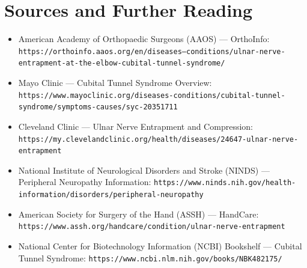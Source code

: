 \section*{Sources and Further Reading}
\begin{itemize}
\item American Academy of Orthopaedic Surgeons (AAOS) --- OrthoInfo: \texttt{https://orthoinfo.aaos.org/en/diseases--conditions/ulnar-nerve-entrapment-at-the-elbow-cubital-tunnel-syndrome/}
\item Mayo Clinic --- Cubital Tunnel Syndrome Overview: \texttt{https://www.mayoclinic.org/diseases-conditions/cubital-tunnel-syndrome/symptoms-causes/syc-20351711}
\item Cleveland Clinic --- Ulnar Nerve Entrapment and Compression: \texttt{https://my.clevelandclinic.org/health/diseases/24647-ulnar-nerve-entrapment}
\item National Institute of Neurological Disorders and Stroke (NINDS) --- Peripheral Neuropathy Information: \texttt{https://www.ninds.nih.gov/health-information/disorders/peripheral-neuropathy}
\item American Society for Surgery of the Hand (ASSH) --- HandCare: \texttt{https://www.assh.org/handcare/condition/ulnar-nerve-entrapment}
\item National Center for Biotechnology Information (NCBI) Bookshelf --- Cubital Tunnel Syndrome: \texttt{https://www.ncbi.nlm.nih.gov/books/NBK482175/}
\end{itemize}